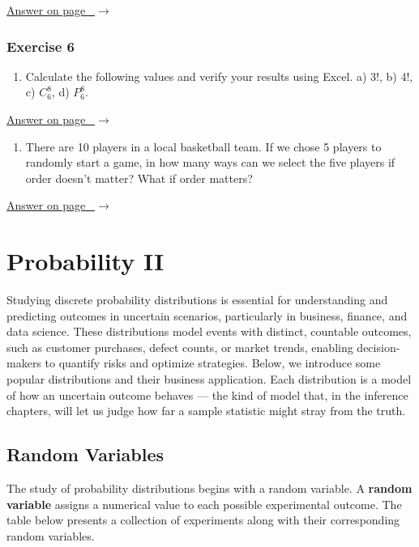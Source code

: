 \documentclass[
  11pt,
  letterpaper,
  DIV=11,
  numbers=noendperiod,
  oneside,
  open=any]{scrreprt}
\providecommand{\tightlist}{%
  \setlength{\itemsep}{0pt}\setlength{\parskip}{0pt}}\usepackage{longtable,booktabs,array}
\newcommand{\bsanswerref}[1]{%
  \par\nopagebreak\hypertarget{q-#1}{}\label{q-#1}%
  {\raggedleft\sffamily\footnotesize\hyperlink{a-#1}{\textcolor{bsaccent}{Answer on page \pageref{a-#1}\ $\rightarrow$}}\par}%
  \medskip}
\begin{document}
\bsanswerref{bsans81}

\subsection*{Exercise 6}\label{exercise-6-1}

\begin{enumerate}
\def\labelenumi{\arabic{enumi}.}
\tightlist
\item
  Calculate the following values and verify your results using Excel. a)
  3!, b) 4!, c) \(C_6^8\), d) \(P_6^8\).
\end{enumerate}

\bsanswerref{bsans82}

\begin{enumerate}
\def\labelenumi{\arabic{enumi}.}
\setcounter{enumi}{1}
\tightlist
\item
  There are 10 players in a local basketball team. If we chose 5 players
  to randomly start a game, in how many ways can we select the five
  players if order doesn't matter? What if order matters?
\end{enumerate}

\bsanswerref{bsans83}

\chapter{Probability II}\label{probability-ii}

Studying discrete probability distributions is essential for
understanding and predicting outcomes in uncertain scenarios,
particularly in business, finance, and data science. These distributions
model events with distinct, countable outcomes, such as customer
purchases, defect counts, or market trends, enabling decision-makers to
quantify risks and optimize strategies. Below, we introduce some popular
distributions and their business application. Each distribution is a
model of how an uncertain outcome behaves --- the kind of model that, in
the inference chapters, will let us judge how far a sample statistic
might stray from the truth.

\section{Random Variables}\label{random-variables}

The study of probability distributions begins with a random variable. A
\textbf{random variable} assigns a numerical value to each possible
experimental outcome. The table below presents a collection of
experiments along with their corresponding random variables.
\end{document}
